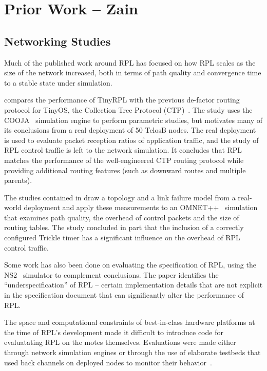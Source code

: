 \section{Prior Work -- Zain}

\subsection{Networking Studies}
Much of the published work around RPL has focused on how RPL scales as the size
of the network increased, both in terms of path quality and convergence time to
a stable state under simulation. 

\cite{ko2011evaluating} compares the performance of TinyRPL with the previous
de-factor routing protocol for TinyOS, the Collection Tree Protocol
(CTP)~\cite{ctp}. The study uses the COOJA~\cite{cooja} simulation engine to
perform parametric studies, but motivates many of its conclusions from a real
deployment of 50 TelosB nodes. The real deployment is used to evaluate packet
reception ratios of application traffic, and the study of RPL control traffic
is left to the network simulation. It concludes that RPL matches the
performance of the well-engineered CTP routing protocol while providing
additional routing features (such as downward routes and multiple parents).

The studies contained in \cite{tripathi2010performance} draw a topology and a
link failure model from a real-world deployment and apply these measurements to
an OMNET++~\cite{omnet++} simulation that examines path quality, the overhead
of control packets and the size of routing tables. The study concluded in part
that the inclusion of a correctly configured Trickle timer has a significant influence
on the overhead of RPL control traffic.

Some work \cite{clausen2011critical} has also been done on evaluating the
specification of RPL, using the NS2~\cite{ns2} simulator to complement
conclusions. The paper identifies the ``underspecification'' of RPL -- certain
implementation details that are not explicit in the specification document that
can significantly alter the performance of RPL.

The space and computational constraints of best-in-class hardware platforms at
the time of RPL's development made it difficult to introduce code for
evaluatating RPL on the motes themselves. Evaluations were made either through
network simulation engines or through the use of elaborate testbeds that used
back channels on deployed nodes to monitor their
behavior~\cite{fonseca2008tracking}. 

